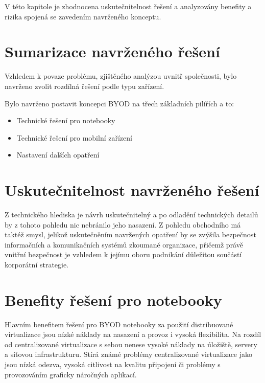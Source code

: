 V této kapitole je zhodnocena uskutečnitelnost řešení a analyzovány benefity a rizika spojená se zavedením navrženého konceptu.

\section{Sumarizace navrženého řešení}
Vzhledem k povaze problému, zjištěného analýzou uvnitř společnosti, bylo navrženo zvolit rozdílná řešení podle typu zařízení.

Bylo navrženo postavit koncepci BYOD na třech základních pilířích a to:

\begin{itemize}
    \item Technické řešení pro notebooky
    \item Technické řešení pro mobilní zařízení
    \item Nastavení dalších opatření
\end{itemize}


\section{Uskutečnitelnost navrženého řešení}
Z technického hlediska je návrh uskutečnitelný a po odladění technických detailů by z tohoto pohledu nic nebránilo jeho nasazení. Z pohledu obchodního má taktéž smysl, jelikož uskutečněním navržených opatření by se zvýšila bezpečnost informačních a komunikačních systémů zkoumané organizace, přičemž právě vnitřní bezpečnost je vzhledem k jejímu oboru podnikání důležitou součástí korporátní strategie. 

\section{Benefity řešení pro notebooky}

Hlavním benefitem řešení pro BYOD notebooky za použití distribuované virtualizace jsou nízké náklady na nasazení a provoz i vysoká flexibilita. Na rozdíl od centralizované virtualizace s sebou nenese vysoké náklady na úložiště, servery a síťovou infrastrukturu. Stírá známé problémy centralizované virtualizace jako jsou nízká odezva, vysoká citlivost na kvalitu připojení či problémy s provozováním graficky náročných aplikací.


